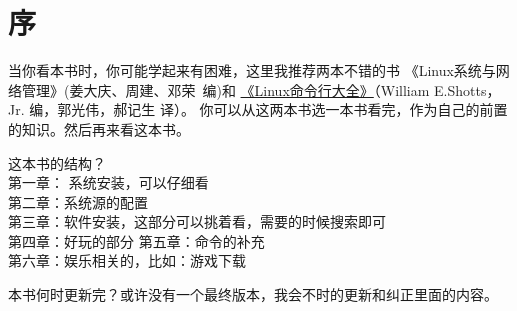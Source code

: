 \chapter{序}

当你看本书时，你可能学起来有困难，这里我推荐两本不错的书 《Linux系统与网络管理》(姜大庆、周建、邓荣~编)和 
\href{https://item.jd.com/11196146.html}{《Linux命令行大全》}（William E.Shotts，Jr. 编，郭光伟，郝记生 译）。
你可以从这两本书选一本书看完，作为自己的前置的知识。然后再来看这本书。


这本书的结构？\\
第一章： 系统安装，可以仔细看\\
第二章：系统源的配置\\
第三章：软件安装，这部分可以挑着看，需要的时候搜索即可\\
第四章：好玩的部分
第五章：命令的补充\\
第六章：娱乐相关的，比如：游戏下载

本书何时更新完？或许没有一个最终版本，我会不时的更新和纠正里面的内容。